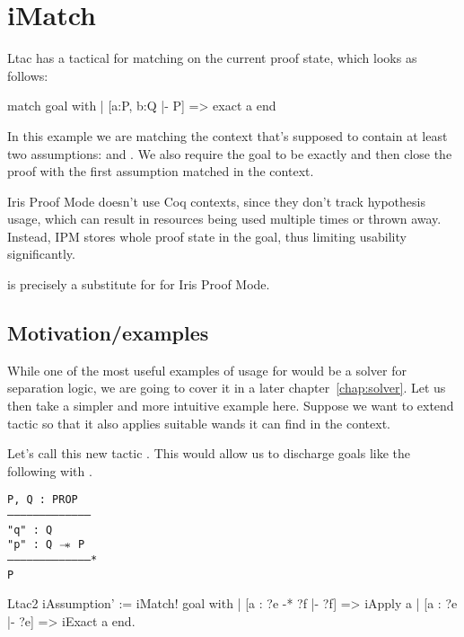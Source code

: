 \chapter{iMatch}
\label{chap:imatch}


Ltac has a tactical for matching on the current proof state, which looks as follows:
\begin{coq}
match goal with
| [a:P, b:Q |- P] => exact a
end
\end{coq}
In this example we are matching the context that's supposed to contain at least two assumptions:  and .
We also require the goal to be exactly  and then close the proof with the first assumption matched in the context.

Iris Proof Mode doesn't use Coq contexts, since they don't track hypothesis usage, which can result in resources being used multiple times or thrown away.
Instead, IPM stores whole proof state in the goal, thus limiting usability  significantly.

 is precisely a substitute for  for Iris Proof Mode.

\section{Motivation/examples}

While one of the most useful examples of usage for  would be a solver for separation logic, we are going to cover it in a later chapter~\ref{chap:solver}.
Let us then take a simpler and more intuitive example here.
Suppose we want to extend  tactic so that it also applies suitable wands it can find in the context.

Let's call this new tactic .
This would allow us to discharge goals like the following with .\\

\begin{minipage}{\linewidth}
\texttt{P, Q : PROP\\
---------------------------------------\\
"q" : Q\\
"p" : Q $\mathrel{-\mkern-6mu*}$ P\\
---------------------------------------*\\
P
}
\end{minipage}


\begin{minipage}{\linewidth}
\begin{coq}
Ltac2 iAssumption' :=
  iMatch! goal with
  | [a : ?e -* ?f |- ?f] => iApply a
  | [a : ?e |- ?e] => iExact a
  end.
\end{coq}
\end{minipage}

